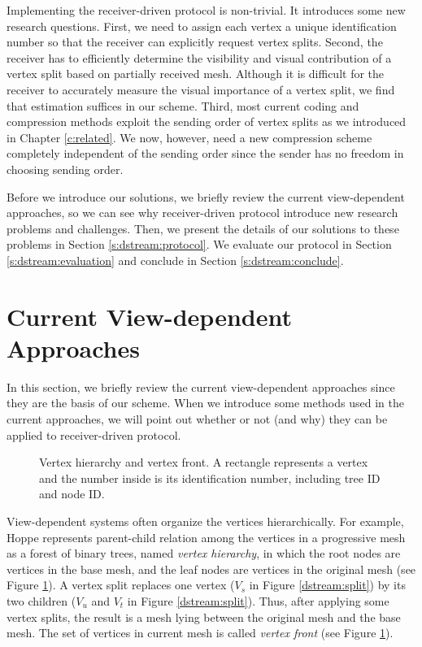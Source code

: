     Implementing the receiver-driven protocol is non-trivial. It introduces some 
    new research questions. First, we need to assign each vertex a unique identification number
    so that the receiver can explicitly request vertex splits. 
    Second, the receiver has to efficiently determine the visibility and visual contribution
    of a vertex split based on partially received mesh. 
    Although it is difficult for the receiver to accurately measure
    the visual importance of a vertex split, we find that estimation suffices
    in our scheme.  
    Third, most current coding and compression methods exploit the sending order of vertex splits
    as we introduced in Chapter \ref{c:related}. We now, however, need a new compression scheme
    completely independent of the sending order since the sender has no freedom in choosing sending order.

    Before we introduce our solutions, we briefly review the current view-dependent approaches,
    so we can see why receiver-driven protocol introduce new research problems and challenges. 
    Then, we present the details of our solutions to these problems in Section \ref{s:dstream:protocol}.
    We evaluate our protocol in Section \ref{s:dstream:evaluation} and conclude in Section \ref{s:dstream:conclude}.

\section{Current View-dependent Approaches}
\label{s:dstream:terms}
    In this section, we briefly review the current view-dependent approaches since 
    they are the basis of our scheme. When we introduce some methods used in the current approaches, 
    we will point out whether or not (and why) they can be applied to receiver-driven
    protocol.
   
    \begin{figure}
    \centering
    \caption{Vertex hierarchy and vertex front. A rectangle represents a vertex and the number inside
    is its identification number, including tree ID and node ID.\label{dstream:hierarchy}}
    \end{figure}
    View-dependent systems often organize the vertices hierarchically.
    For example, Hoppe \cite{258843} represents
    parent-child relation among the vertices in a progressive mesh
    as a forest of binary trees, named \emph{vertex hierarchy},
    in which the root nodes are vertices in the base mesh, and
    the leaf nodes are vertices in the original mesh (see Figure \ref{dstream:hierarchy}).
    A vertex split replaces one vertex ($V_s$ in Figure \ref{dstream:split})
    by its two children ($V_u$ and $V_t$ in Figure \ref{dstream:split}).
    Thus, after applying some vertex splits,
    the result is a mesh lying between the original mesh and the base mesh.
    The set of vertices in current mesh is called \emph{vertex front}
    \cite{258843}
    (see Figure \ref{dstream:hierarchy}).%
    
